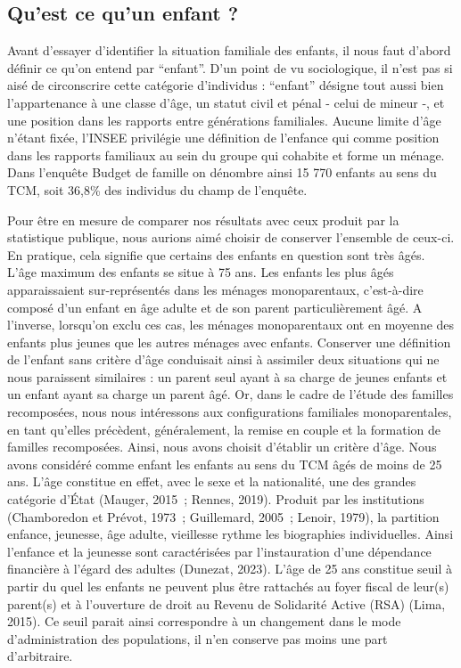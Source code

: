 \documentclass[
  12pt,
]{book}
\begin{document}
\subsection{Qu'est ce qu'un enfant ?}\label{quest-ce-quun-enfant}

Avant d'essayer d'identifier la situation familiale des enfants, il nous
faut d'abord définir ce qu'on entend par ``enfant''. D'un point de vu
sociologique, il n'est pas si aisé de circonscrire cette catégorie
d'individus : ``enfant'' désigne tout aussi bien l'appartenance à une
classe d'âge, un statut civil et pénal - celui de mineur -, et une
position dans les rapports entre générations familiales. Aucune limite
d'âge n'étant fixée, l'INSEE privilégie une définition de l'enfance qui
comme position dans les rapports familiaux au sein du groupe qui
cohabite et forme un ménage. Dans l'enquête Budget de famille on
dénombre ainsi 15 770 enfants au sens du TCM, soit 36,8\% des individus
du champ de l'enquête.

Pour être en mesure de comparer nos résultats avec ceux produit par la
statistique publique, nous aurions aimé choisir de conserver l'ensemble
de ceux-ci. En pratique, cela signifie que certains des enfants en
question sont très âgés. L'âge maximum des enfants se situe à 75 ans.
Les enfants les plus âgés apparaissaient sur-représentés dans les
ménages monoparentaux, c'est-à-dire composé d'un enfant en âge adulte et
de son parent particulièrement âgé. A l'inverse, lorsqu'on exclu ces
cas, les ménages monoparentaux ont en moyenne des enfants plus jeunes
que les autres ménages avec enfants. Conserver une définition de
l'enfant sans critère d'âge conduisait ainsi à assimiler deux situations
qui ne nous paraissent similaires : un parent seul ayant à sa charge de
jeunes enfants et un enfant ayant sa charge un parent âgé. Or, dans le
cadre de l'étude des familles recomposées, nous nous intéressons aux
configurations familiales monoparentales, en tant qu'elles précèdent,
généralement, la remise en couple et la formation de familles
recomposées. Ainsi, nous avons choisit d'établir un critère d'âge. Nous
avons considéré comme enfant les enfants au sens du TCM âgés de moins de
25 ans. L'âge constitue en effet, avec le sexe et la nationalité, une
des grandes catégorie d'État (Mauger, 2015~; Rennes, 2019). Produit par
les institutions (Chamboredon et Prévot, 1973~; Guillemard, 2005~;
Lenoir, 1979), la partition enfance, jeunesse, âge adulte, vieillesse
rythme les biographies individuelles. Ainsi l'enfance et la jeunesse
sont caractérisées par l'instauration d'une dépendance financière à
l'égard des adultes (Dunezat, 2023). L'âge de 25 ans constitue seuil à
partir du quel les enfants ne peuvent plus être rattachés au foyer
fiscal de leur(s) parent(s) et à l'ouverture de droit au Revenu de
Solidarité Active (RSA) (Lima, 2015). Ce seuil parait ainsi correspondre
à un changement dans le mode d'administration des populations, il n'en
conserve pas moins une part d'arbitraire.
\end{document}
